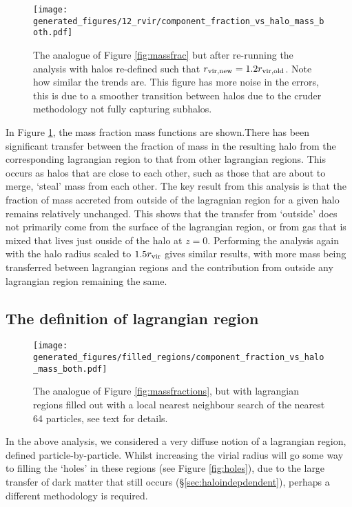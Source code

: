 \begin{figure}
    \centering
    \texttt{[image: generated\_figures/12\_rvir/component\_fraction\_vs\_halo\_mass\_both.pdf]}
    \caption{The analogue of Figure \ref{fig:massfrac} but after re-running
    the analysis with halos re-defined such that $r_{\rm vir, new} = 1.2
    r_{\rm vir, old}$. Note how similar the trends are. This figure has
    more noise in the errors, this is due to a smoother transition
    between halos due to the cruder methodology not fully capturing
    subhalos.}
    \label{fig:comparevirialradii}
\end{figure}
In Figure \ref{fig:comparevirialradii}, the mass fraction mass functions are
shown.There has been significant transfer between the fraction of mass in the
resulting halo from the corresponding lagrangian region to that from other
lagrangian regions. This occurs as halos that are close to each other, such as
those that are about to merge, `steal' mass from each other. The key result
from this analysis is that the fraction of mass accreted from outside of the
lagragnian region for a given halo remains relatively unchanged. This shows
that the transfer from `outside' does not primarily come from the surface of
the lagrangian region, or from gas that is mixed that lives just ouside of the
halo at $z=0$. Performing the analysis again with the halo radius scaled to
$1.5 r_{\rm vir}$ gives similar results, with more mass being transferred
between lagrangian regions and the contribution from outside any lagrangian
region remaining the same.

\subsection{The definition of lagrangian region}

\begin{figure}
    \centering
    \texttt{[image: generated\_figures/filled\_regions/component\_fraction\_vs\_halo\_mass\_both.pdf]}
    \caption{The analogue of Figure \ref{fig:massfractions}, but with lagrangian
	regions filled out with a local nearest neighbour search of the
	nearest 64 particles, see text for details.}
    \label{fig:filledlrmass}
\end{figure}

In the above analysis, we considered a very diffuse notion of a lagrangian
region, defined particle-by-particle. Whilst increasing the virial radius
will go some way to filling the `holes' in these regions (see Figure
\ref{fig:holes}), due to the large transfer of dark matter that still occurs
(\S \ref{sec:haloindepdendent}), perhaps a different methodology is required.

